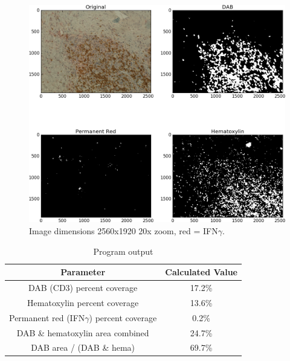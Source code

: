 \documentclass[12pt]{article}
\begin{document}
\begin{figure}[H]
  \includegraphics[width=\linewidth]{10_IFNg_20x.png}
  \caption{Image dimensions 2560x1920
20x zoom, red = IFN$\gamma$.}
  \label{fig:10 IFNg}
\end{figure}


\begin{table}[H]
\centering
\caption{Program output}
\label{program output}
\begin{tabular}{|c|c|}
\hline
\textbf{Parameter} & \textbf{Calculated Value} \\ \hline
DAB (CD3) percent coverage & 17.2\% \\ \hline
Hematoxylin percent coverage & 13.6\% \\ \hline
Permanent red (IFN$\gamma$) percent coverage & 0.2\% \\ \hline
DAB \& hematoxylin area combined & 24.7\% \\ \hline
DAB area / (DAB \& hema) & 69.7\% \\ \hline
\end{tabular}
\end{table}

\end{document}
